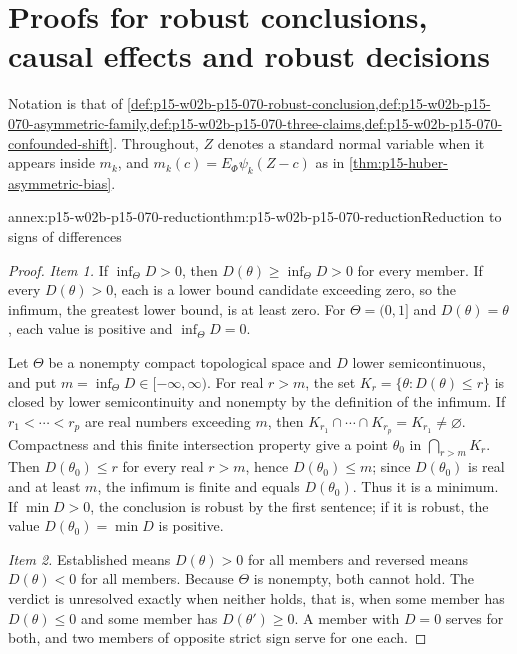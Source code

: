 \section{Proofs for robust conclusions, causal effects and robust decisions}
\label{sec:annex-p15-w02b-p15-070}

Notation is that of
\cref{def:p15-w02b-p15-070-robust-conclusion,def:p15-w02b-p15-070-asymmetric-family,def:p15-w02b-p15-070-three-claims,def:p15-w02b-p15-070-confounded-shift}.
Throughout, \(Z\) denotes a standard normal variable when it appears
inside \(m_k\), and \(m_k(c)=E_\Phi\psi_k(Z-c)\) as in
\cref{thm:p15-huber-asymmetric-bias}.

\begin{annexitem}{annex:p15-w02b-p15-070-reduction}{thm:p15-w02b-p15-070-reduction}{Reduction to signs of differences}
\begin{proof}
\emph{Item 1.} If \(\inf_\Theta D>0\), then
\(D(\theta)\geq\inf_\Theta D>0\) for every member. If every
\(D(\theta)>0\), each is a lower bound candidate exceeding zero, so the
infimum, the greatest lower bound, is at least zero. For
\(\Theta=(0,1]\) and \(D(\theta)=\theta\), each value is positive and
\(\inf_\Theta D=0\).

Let \(\Theta\) be a nonempty compact topological space and \(D\) lower
semicontinuous, and put \(m=\inf_\Theta D\in[-\infty,\infty)\).
For real \(r>m\), the set \(K_r=\{\theta:D(\theta)\leq r\}\) is closed
by lower semicontinuity and nonempty by the definition of the infimum.
If \(r_1<\cdots<r_p\) are real numbers exceeding \(m\), then
\(K_{r_1}\cap\cdots\cap K_{r_p}=K_{r_1}\neq\varnothing\).
Compactness and this finite intersection property give a point
\(\theta_0\) in \(\bigcap_{r>m}K_r\). Then \(D(\theta_0)\leq r\) for
every real \(r>m\), hence \(D(\theta_0)\leq m\); since \(D(\theta_0)\)
is real and at least \(m\), the infimum is finite and equals
\(D(\theta_0)\). Thus it is a minimum. If \(\min D>0\), the conclusion
is robust by the first sentence; if it is robust, the value
\(D(\theta_0)=\min D\) is positive.

\emph{Item 2.} Established means \(D(\theta)>0\) for all members and
reversed means \(D(\theta)<0\) for all members. Because \(\Theta\) is
nonempty, both cannot hold. The verdict is unresolved exactly when
neither holds, that is, when some member has \(D(\theta)\leq0\) and some
member has \(D(\theta')\geq0\). A member with \(D=0\) serves for both, and
two members of opposite strict sign serve for one each.


\end{proof}
\end{annexitem}
